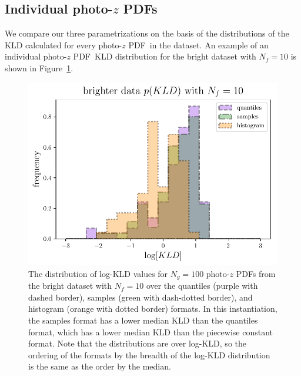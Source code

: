 \documentclass[\docopts]{\docclass}
\newcommand{\pz}{photo-$z$ PDF}
\newcommand{\mgdata}{bright\xspace}
\begin{document}
\subsection{Individual \pz s}
\label{sec:individual_results}

We compare our three parametrizations on the basis of the distributions of the 
KLD calculated for every \pz\ in the dataset.
An example of an individual \pz\ KLD distribution for the \mgdata dataset with 
$N_{f}=10$ is shown in Figure~\ref{fig:individual}.
\begin{figure}
  \begin{center}
    \includegraphics[width=\columnwidth]{figures/individual_kld.pdf}
    \caption{The distribution of log-KLD values for $N_{g}=100$ \pz s from the 
\mgdata dataset with $N_{f}=10$ over the quantiles (purple with dashed border), 
samples (green with dash-dotted border), and histogram (orange with dotted 
border) formats.
    In this instantiation, the samples format has a lower median KLD than the 
quantiles format, which has a lower median KLD than the piecewise constant 
format.  Note that the distributions are over log-KLD, so the ordering of the 
formats by the breadth of the log-KLD distribution is the same as the order by 
the median.
    \label{fig:individual}}
  \end{center}
\end{figure}
\end{document}
